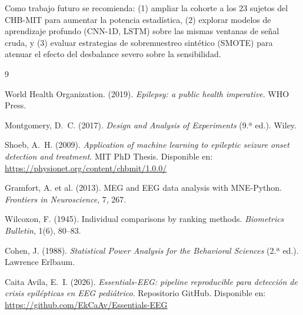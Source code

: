 \documentclass[12pt,a4paper]{article}
\begin{document}
\vspace{0.5cm}

\noindent Como trabajo futuro se recomienda: (1) ampliar la cohorte a los 23 sujetos del
CHB-MIT para aumentar la potencia estadística, (2) explorar modelos de aprendizaje
profundo (CNN-1D, LSTM) sobre las mismas ventanas de señal cruda, y (3) evaluar
estrategias de sobremuestreo sintético (SMOTE) para atenuar el efecto del desbalance
severo sobre la sensibilidad.

\begin{thebibliography}{9}

  World Health Organization. (2019). \textit{Epilepsy: a public health imperative}.
  WHO Press.

  Montgomery, D.~C. (2017). \textit{Design and Analysis of Experiments} (9.ª ed.).
  Wiley.

  Shoeb, A.~H. (2009). \textit{Application of machine learning to epileptic seizure
  onset detection and treatment}. MIT PhD Thesis.
  Disponible en: \url{https://physionet.org/content/chbmit/1.0.0/}

  Gramfort, A. et al. (2013). MEG and EEG data analysis with MNE-Python.
  \textit{Frontiers in Neuroscience}, 7, 267.

  Wilcoxon, F. (1945). Individual comparisons by ranking methods.
  \textit{Biometrics Bulletin}, 1(6), 80--83.

  Cohen, J. (1988). \textit{Statistical Power Analysis for the Behavioral Sciences}
  (2.ª ed.). Lawrence Erlbaum.

  Caita Avila, E.~I. (2026). \textit{Essentials-EEG: pipeline reproducible para
  detección de crisis epilépticas en EEG pediátrico}. Repositorio GitHub.
  Disponible en: \url{https://github.com/EkCaAv/Essentials-EEG}

\end{thebibliography}
\end{document}
